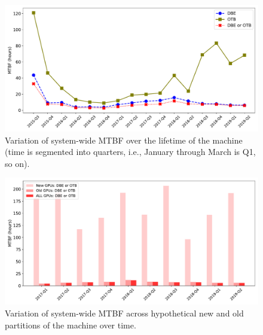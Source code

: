 

\begin{figure}[bt]
  \begin{center}
    \includegraphics[width=\columnwidth]{figs/MTBF_quaterly_sys.pdf}
  \end{center}
  \caption{Variation of system-wide MTBF over the lifetime of the machine (time is segmented into quarters, 
i.e., January through March is Q1, so on).}
  \label{fig:MTBF_sys}
\end{figure}

\begin{figure}[bt]
  \begin{center}
    \includegraphics[width=\columnwidth]{figs/MTBF_quaterly_sys_NewOldALL.pdf}
  \end{center}
  \caption{Variation of system-wide MTBF across hypothetical new and old partitions of the machine over time.}
  \label{fig:MTBF_sys_NewOld}
\end{figure}

